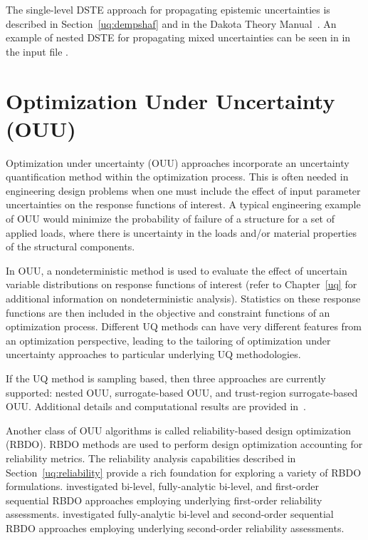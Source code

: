 The single-level DSTE approach for propagating epistemic uncertainties
is described in Section~\ref{uq:dempshaf} and in the Dakota Theory
Manual~\cite{TheoMan}. An example of nested DSTE for propagating mixed
uncertainties can be seen in  in the input file
.


\section{Optimization Under Uncertainty (OUU)} \label{adv_models:ouu}

Optimization under uncertainty (OUU) approaches incorporate an
uncertainty quantification method within the optimization
process. This is often needed in engineering design problems when one
must include the effect of input parameter uncertainties on the
response functions of interest. A typical engineering example of OUU
would minimize the probability of failure of a structure for a set of
applied loads, where there is uncertainty in the loads and/or material
properties of the structural components.

In OUU, a nondeterministic method is used to evaluate the effect of
uncertain variable distributions on response functions of interest
(refer to Chapter~\ref{uq} for additional information on
nondeterministic analysis). Statistics on these response functions are
then included in the objective and constraint functions of an
optimization process. Different UQ methods can have very different
features from an optimization perspective, leading to the tailoring of
optimization under uncertainty approaches to particular underlying UQ
methodologies.

If the UQ method is sampling based, then three approaches are
currently supported: nested OUU, surrogate-based OUU, and trust-region
surrogate-based OUU. Additional details and computational results are
provided in~\cite{Eld02}.

Another class of OUU algorithms is called reliability-based design
optimization (RBDO). RBDO methods are used to perform design
optimization accounting for reliability metrics. The reliability
analysis capabilities described in Section~\ref{uq:reliability}
provide a rich foundation for exploring a variety of RBDO
formulations. \cite{Eld05} investigated bi-level, fully-analytic
bi-level, and first-order sequential RBDO approaches employing
underlying first-order reliability assessments.
\cite{Eld06a} investigated fully-analytic bi-level and 
second-order sequential RBDO approaches employing underlying
second-order reliability assessments. 

